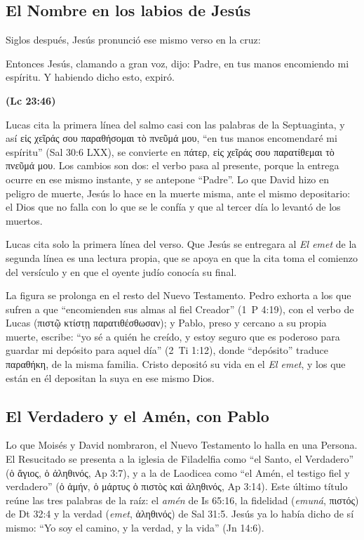 \documentclass[11pt,letterpaper]{article}
\newcommand{\grc}[1]{\foreignlanguage{ancientgreek}{#1}}
\newcommand{\fuente}[1]{\par\hfill{\upshape\bfseries\small\textcolor{azul}{#1}}}
\begin{document}
\subsection{El Nombre en los labios de Jesús}
Siglos después, Jesús pronunció ese mismo verso en la cruz:

\begin{cita}Entonces Jesús, clamando a gran voz, dijo: Padre, en tus manos encomiendo mi espíritu. Y habiendo dicho esto, expiró.\fuente{(Lc 23:46)}\end{cita}

Lucas cita la primera línea del salmo casi con las palabras de la Septuaginta, y así \grc{εἰς χεῖράς σου παραθήσομαι τὸ πνεῦμά μου}, ``en tus manos encomendaré mi espíritu'' (Sal 30:6 LXX), se convierte en \grc{πάτερ, εἰς χεῖράς σου παρατίθεμαι τὸ πνεῦμά μου}. Los cambios son dos: el verbo pasa al presente, porque la entrega ocurre en ese mismo instante, y se antepone ``Padre''. Lo que David hizo en peligro de muerte, Jesús lo hace en la muerte misma, ante el mismo depositario: el Dios que no falla con lo que se le confía y que al tercer día lo levantó de los muertos.

\begin{nota}[Precisión]
Lucas cita solo la primera línea del verso. Que Jesús se entregara al \emph{El emet} de la segunda línea es una lectura propia, que se apoya en que la cita toma el comienzo del versículo y en que el oyente judío conocía su final.
\end{nota}

La figura se prolonga en el resto del Nuevo Testamento. Pedro exhorta a los que sufren a que ``encomienden sus almas al fiel Creador'' (1~P 4:19), con el verbo de Lucas (\grc{πιστῷ κτίστῃ παρατιθέσθωσαν}); y Pablo, preso y cercano a su propia muerte, escribe: ``yo sé a quién he creído, y estoy seguro que es poderoso para guardar mi depósito para aquel día'' (2~Ti 1:12), donde ``depósito'' traduce \grc{παραθήκη}, de la misma familia. Cristo depositó su vida en el \emph{El emet}, y los que están en él depositan la suya en ese mismo Dios.

\subsection{El Verdadero y el Amén, con Pablo}
Lo que Moisés y David nombraron, el Nuevo Testamento lo halla en una Persona. El Resucitado se presenta a la iglesia de Filadelfia como ``el Santo, el Verdadero'' (\grc{ὁ ἅγιος, ὁ ἀληθινός}, Ap 3:7), y a la de Laodicea como ``el Amén, el testigo fiel y verdadero'' (\grc{ὁ ἀμήν, ὁ μάρτυς ὁ πιστὸς καὶ ἀληθινός}, Ap 3:14). Este último título reúne las tres palabras de la raíz: el \emph{amén} de Is 65:16, la fidelidad (\emph{emuná}, \grc{πιστός}) de Dt 32:4 y la verdad (\emph{emet}, \grc{ἀληθινός}) de Sal 31:5. Jesús ya lo había dicho de sí mismo: ``Yo soy el camino, y la verdad, y la vida'' (Jn 14:6).
\end{document}
